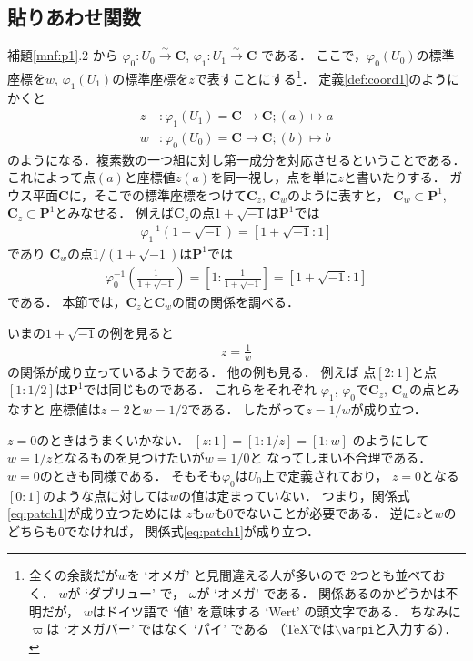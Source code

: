 \documentclass[11pt, a4paper, dvipdfmx, draft]{jsarticle}
\theoremstyle{definition}
\newcommand{\cc}{\mathbf{C}}
\newcommand{\pp}{\mathbf{P}}
\newcommand{\pphi}{\varphi} %
\newcommand{\isom}{\overset{\sim}{\longrightarrow}}
\theoremstyle{mystyle}
\numberwithin{equation}{section} %
\begin{document}
\subsection{貼りあわせ関数}\label{ssec:patch}

補題\ref{mnf:p1}.2 から
$\pphi_0 \colon U_0\isom\cc$, $\pphi_1\colon {U_1} \isom\cc$
である．
ここで，$\pphi_0(U_0)$の標準座標を$w$, 
$\pphi_1(U_1)$の標準座標を$z$で表すことにする\footnote{
    全くの余談だが$w$を `オメガ' と見間違える人が多いので
    2つとも並べておく．
    $w$が `ダブリュー' で，
    $\omega$が `オメガ' である．
    関係あるのかどうかは不明だが，
    $w$はドイツ語で `値' を意味する `Wert' の頭文字である．
    ちなみに$\varpi$は `オメガバー' ではなく `パイ' である
    （\TeX では\texttt{$\backslash$varpi}と入力する）．}．
定義\ref{def:coord1}のようにかくと
\begin{align*}
    z&\colon \pphi_1(U_1)= \cc \to \cc; (a)\mapsto a\\
    w&\colon \pphi_0(U_0)= \cc \to \cc; (b)\mapsto b
\end{align*}
のようになる．複素数の一つ組に対し第一成分を対応させるということである．
これによって点$(a)$と座標値$z(a)$を同一視し，点を単に$z$と書いたりする．
ガウス平面$\cc$に，そこでの標準座標をつけて$\cc_z$, $\cc_w$のように表すと，
$\cc_w\subset\pp^1$, $\cc_z\subset\pp^1$とみなせる．
例えば$\cc_z$の点$1+\sqrt{-1}$は$\pp^1$では
\begin{align*}
    \pphi_1^{-1}\left(1+\sqrt{-1}\right)=\left[1+\sqrt{-1}\colon 1\right]    
\end{align*}
であり
$\cc_w$の点$1/(1+\sqrt{-1})$は$\pp^1$では
\begin{align*}
    \pphi_0^{-1}\left(\frac{1}{1+\sqrt{-1}}\right)
    =\left[1\colon \frac{1}{1+\sqrt{-1}}\right]
    =\left[1+\sqrt{-1}\colon 1\right]        
\end{align*}
である．
本節では，$\cc_z$と$\cc_w$の間の関係を調べる．

いまの$1+\sqrt{-1}$の例を見ると
\begin{align}\label{eq:patch1}
    z=\frac{1}{w}
\end{align}
の関係が成り立っているようである．
他の例も見る．
例えば
点$[2\colon 1]$と点$[1\colon 1/2]$は$\pp^1$では同じものである．
これらをそれぞれ
$\pphi_1$, $\pphi_0$で$\cc_z$, $\cc_w$の点とみなすと
座標値は$z=2$と$w=1/2$である．
したがって$z=1/w$が成り立つ．

$z=0$のときはうまくいかない．
$[z\colon 1] = [1\colon 1/z] = [1\colon w]$
のようにして$w=1/z$となるものを見つけたいが$w=1/0$と
なってしまい不合理である．
$w=0$のときも同様である．
そもそも$\pphi_0$は$U_0$上で定義されており，
$z=0$となる$[0\colon 1]$のような点に対しては$w$の値は定まっていない．
つまり，関係式\eqref{eq:patch1}が成り立つためには
$z$も$w$も0でないことが必要である．
逆に$z$と$w$のどちらも0でなければ，
関係式\eqref{eq:patch1}が成り立つ．
\end{document}
